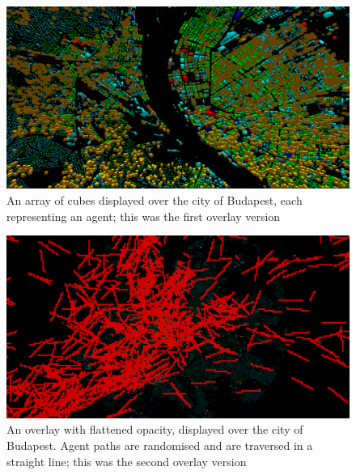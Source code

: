 \appendix
\chapter*{\fuggelek}
\setcounter{chapter}{\appendixnumber}

\begin{figure}[h]
    \centering
    \includegraphics[width=140mm, keepaspectratio]{images/overlay_v1.png}
    \caption{An array of cubes displayed over the city of Budapest, each representing an agent; this was the first overlay version\ \label{overlay_v1}}
\end{figure}
\begin{figure}[h]
    \centering
    \includegraphics[width=140mm, keepaspectratio]{images/overlay_v2.png}
    \caption{An overlay with flattened opacity, displayed over the city of Budapest. Agent paths are randomised and are traversed in a straight line; this was the second overlay version\ \label{overlay_v2}}
\end{figure}